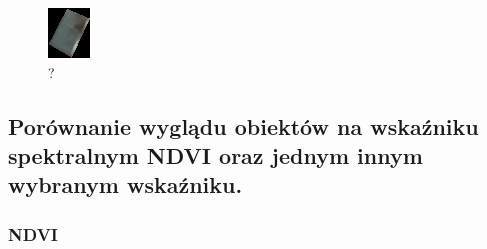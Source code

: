 \documentclass[a4paper,12pt]{article}  %
\begin{document}
\begin{figure}[H]
\begin{minipage}{0.24\textwidth}
        \caption*{?}
    \end{minipage}
    \begin{minipage}{0.24\textwidth}
        \centering
        \includegraphics[width=\linewidth]{spektralne/irgb_budynek3.png}
        \caption*{?}
    \end{minipage}
\end{figure}


\subsection{Porównanie wyglądu obiektów na wskaźniku spektralnym NDVI oraz jednym innym wybranym wskaźniku.}
\subsubsection{NDVI}
\end{document}
